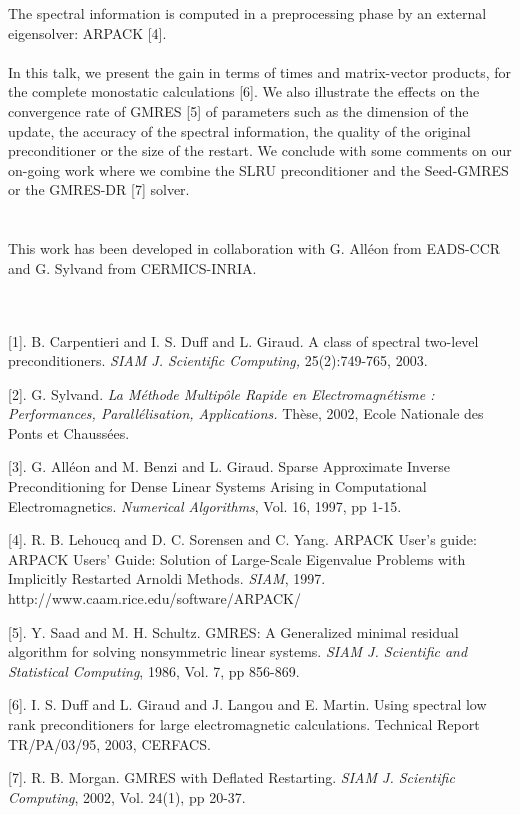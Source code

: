 \documentclass{report}
\begin{document}
The spectral information is computed in a preprocessing phase by an
external eigensolver: ARPACK [4].\\
\\
In this talk, we present the gain in terms of times and matrix-vector
products, for the complete monostatic calculations [6].
We also illustrate the effects on the convergence rate of GMRES [5] of
parameters such as the dimension of the update, the accuracy
of the spectral information, the quality of the original preconditioner
or the size of the restart.
We conclude with some comments on our on-going work where we combine the
SLRU preconditioner and the Seed-GMRES or the GMRES-DR [7] solver.\\
\\
\\
This work has been developed in collaboration with G. All{\'e}on from
EADS-CCR and G. Sylvand from CERMICS-INRIA.\\
\\
\\
\begin{description}
\item{[1].}
B. Carpentieri and I. S. Duff and L. Giraud. A class of spectral
two-level preconditioners.
{\it SIAM J. Scientific Computing,} 25(2):749-765, 2003.
\item{[2].}
G. Sylvand. {\it La M\'ethode Multip\^ole Rapide en Electromagn\'etisme :
Performances, Parall\'elisation, Applications.}
Th\`{e}se, 2002, Ecole {N}ationale des {P}onts et {C}hauss\'ees.
\item{[3].}
G. All{\'e}on and M. Benzi and L. Giraud. Sparse Approximate Inverse
Preconditioning for Dense Linear Systems Arising in Computational
Electromagnetics.
\textit{Numerical Algorithms}, Vol. 16, 1997, pp 1-15.
\item{[4].}
R. B. Lehoucq and D. C. Sorensen and C. Yang. ARPACK User's guide: ARPACK
Users' Guide: Solution of Large-Scale Eigenvalue Problems with Implicitly
Restarted Arnoldi Methods.
\textit{SIAM}, 1997.\\
http://www.caam.rice.edu/software/ARPACK/
\item{[5].}
Y. Saad and M. H. Schultz. GMRES: A Generalized minimal residual
algorithm for solving nonsymmetric linear systems.
\textit{SIAM J. Scientific and Statistical Computing}, 1986, Vol. 7, pp 856-869.
\item{[6].}
I. S. Duff and L. Giraud and J. Langou and E. Martin. Using spectral low
rank preconditioners for large electromagnetic calculations.
Technical Report TR/PA/03/95, 2003, CERFACS.
\item{[7].}
R. B. Morgan. GMRES with Deflated Restarting.
\textit{SIAM J. Scientific Computing}, 2002, Vol. 24(1), pp 20-37.
\end{description}
\end{document}
